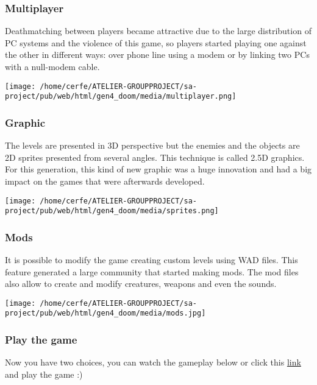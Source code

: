 \documentclass[a4paper,10pt]{book}
\begin{document}
 \subsubsection{Multiplayer }
 
          Deathmatching between players became attractive due to the
          large distribution of PC systems and the violence of this game, so players
          started playing one against the other in different ways: over phone line
          using a modem or by linking two PCs with a null-modem cable.  
 
 
 \texttt{[image: /home/cerfe/ATELIER-GROUPPROJECT/sa-project/pub/web/html/gen4\_doom/media/multiplayer.png]}
 
 
 \subsubsection{Graphic }
 
          The levels are presented in 3D perspective but the enemies and the objects are
          2D sprites presented from several angles. This technique is called
          2.5D graphics. For this generation, this kind of new graphic was a huge
          innovation and had a big impact on the games that were afterwards developed.  
 
 
 \texttt{[image: /home/cerfe/ATELIER-GROUPPROJECT/sa-project/pub/web/html/gen4\_doom/media/sprites.png]}
 
 
 
 \subsubsection{Mods }
 
          It is possible to modify the game creating custom levels using WAD files. This
          feature generated a large community that started making mods. The mod files
          also allow to create and modify creatures, weapons and even the sounds.  
 
 
 \texttt{[image: /home/cerfe/ATELIER-GROUPPROJECT/sa-project/pub/web/html/gen4\_doom/media/mods.jpg]}
 
 \subsubsection{Play the game }
 
          Now you have two choices, you can watch the gameplay below or click this
           \href{https://playclassic.games/games/first-person-shooter-dos-games-online/play-doom-online/play/}{link }
          and play the game :)  
 
\end{document}
